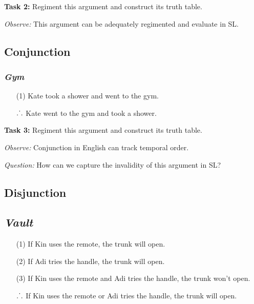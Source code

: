 \documentclass[a4paper, 11pt]{article} %
\def\therefore{\ensuremath{\ldotp\dot{}\,\ldotp}}
\begin{document}
\noindent
\textbf{Task 2:} Regiment this argument and construct its truth table.
\vspace{.05in}

\noindent
\textit{Observe:} This argument can be adequately regimented and evaluate in SL.


\subsection*{\sc Conjunction}

\subsubsection*{\it \textbf{Gym}}

\begin{enumerate}
  \item[(1)] Kate took a shower and went to the gym.
  \item[\therefore] Kate went to the gym and took a shower.
\end{enumerate}

\noindent
\textbf{Task 3:} Regiment this argument and construct its truth table.
\vspace{.05in}

\noindent
\textit{Observe:} Conjunction in English can track temporal order.
\vspace{.05in}

\noindent
\textit{Question:} How can we capture the invalidity of this argument in SL?




\subsection*{\sc Disjunction}

\subsection*{\it \textbf{Vault}}

\begin{enumerate}
  \item[(1)] If Kin uses the remote, the trunk will open. 
  \item[(2)] If Adi tries the handle, the trunk will open.
  \item[(3)] If Kin uses the remote and Adi tries the handle, the trunk won't open.
  \item[\therefore] If Kin uses the remote or Adi tries the handle, the trunk will open. 
\end{enumerate}
\end{document}
